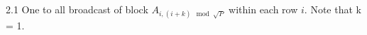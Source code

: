 \documentclass[preview]{standalone}
\begin{document}
\begin{center}
2.1 One to all broadcast of block $A_{i,(i+k) \mod \sqrt{P}}$ within each row $i$. Note that k = 1.
\end{center}
\end{document}
